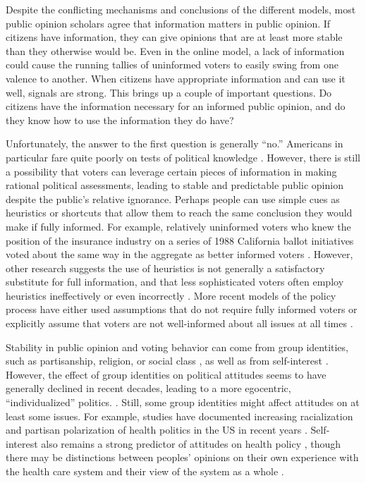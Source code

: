 Despite the conflicting mechanisms and conclusions of the different models, most public opinion scholars agree that information matters in public opinion. If citizens have information, they can give opinions that are at least more stable than they otherwise would be. Even in the online model, a lack of information could cause the running tallies of uninformed voters to easily swing from one valence to another. When citizens have appropriate information and can use it well, signals are strong. This brings up a couple of important questions. Do citizens have the information necessary for an informed public opinion, and do they know how to use the information they do have?

Unfortunately, the answer to the first question is generally ``no.'' Americans in particular fare quite poorly on tests of political knowledge \citep{DelliCarpini1996,Kinder1998}. However, there is still a possibility that voters can leverage certain pieces of information in making rational political assessments, leading to stable and predictable public opinion despite the public's relative ignorance. Perhaps people can use simple cues as heuristics or shortcuts that allow them to reach the same conclusion they would make if fully informed. For example, relatively uninformed voters who knew the position of the insurance industry on a series of 1988 California ballot initiatives voted about the same way in the aggregate as better informed voters \citep{Lupia1994}. However, other research suggests the use of heuristics is not generally a satisfactory substitute for full information, and that less sophisticated voters often employ heuristics ineffectively or even incorrectly \citep{Kuklinski2000,Kinder1998,Lau2001}. More recent models of the policy process have either used assumptions that do not require fully informed voters \citep{Soroka2010} or explicitly assume that voters are not well-informed about all issues at all times \citep{Jones2005,True1999}.

Stability in public opinion and voting behavior can come from group identities, such as partisanship, religion, or social class \citep{Converse1964,Dalton1993}, as well as from self-interest \citep{Dalton1993,Krosnick1990}. However, the effect of group identities on political attitudes seems to have generally declined in recent decades, leading to a more egocentric, ``individualized'' politics. \citep{Dalton1993}. Still, some group identities might affect attitudes on at least some issues. For example, studies have documented increasing racialization and partisan polarization of health politics in the US in recent years \citep{Tesler2012,Henderson2011}. Self-interest also remains a strong predictor of attitudes on health policy \citep{Henderson2011}, though there may be distinctions between peoples' opinions on their own experience with the health care system and their view of the system as a whole \citep{Soroka2013}.

